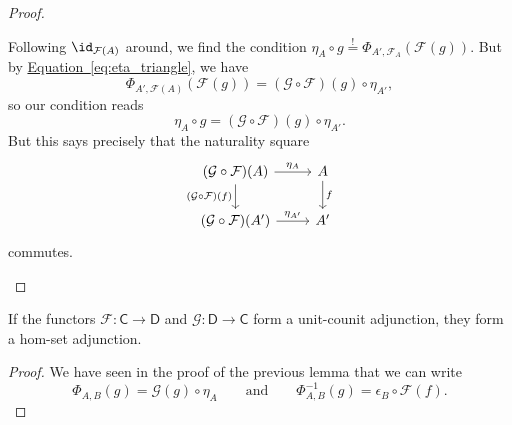 \documentclass[notes.tex]{subfiles}
\begin{document}
\begin{proof}
\begin{enumerate}
      Following $\id_{\mathcal{F}(A)}$ around, we find the condition $\eta_{A} \circ g \overset{!}{=} \Phi_{A', \mathcal{F}_{A}}(\mathcal{F}(g))$. But by \hyperref[eq:eta_triangle]{Equation~\ref*{eq:eta_triangle}}, we have
      \begin{equation*}
        \Phi_{A', \mathcal{F}(A)}(\mathcal{F}(g)) = (\mathcal{G} \circ \mathcal{F})(g) \circ \eta_{A'},
      \end{equation*}
      so our condition reads
      \begin{equation*}
        \eta_{A} \circ g = (\mathcal{G} \circ \mathcal{F})(g) \circ \eta_{A'}.
      \end{equation*}
      But this says precisely that the naturality square
      \begin{equation*}
        \begin{tikzcd}
          (\mathcal{G} \circ \mathcal{F})(A)
          \arrow[r, "\eta_{A}"]
          \arrow[d, swap, "(\mathcal{G} \circ \mathcal{F})(f)"]
          & A
          \arrow[d, "f"]
          \\
          (\mathcal{G} \circ \mathcal{F})(A')
          \arrow[r, "\eta_{A'}"]
          & A'
        \end{tikzcd}
      \end{equation*}
      commutes.

  \end{enumerate}
\end{proof}

\begin{lemma}
  \label{lemma:unit-counit_adjunction_implies_hom-set_adjunction}
  If the functors $\mathcal{F}\colon \mathsf{C} \to \mathsf{D}$ and $\mathcal{G}\colon \mathsf{D} \to \mathsf{C}$ form a unit-counit adjunction, they form a hom-set  adjunction.
\end{lemma}
\begin{proof}
  We have seen in the proof of the previous lemma that we can write
  \begin{equation*}
    \Phi_{A, B}(g) = \mathcal{G}(g) \circ \eta_{A}\qquad\text{and}\qquad \Phi^{-1}_{A,B}(g) = \epsilon_{B} \circ \mathcal{F}(f).
  \end{equation*}
\end{proof}
\end{document}
